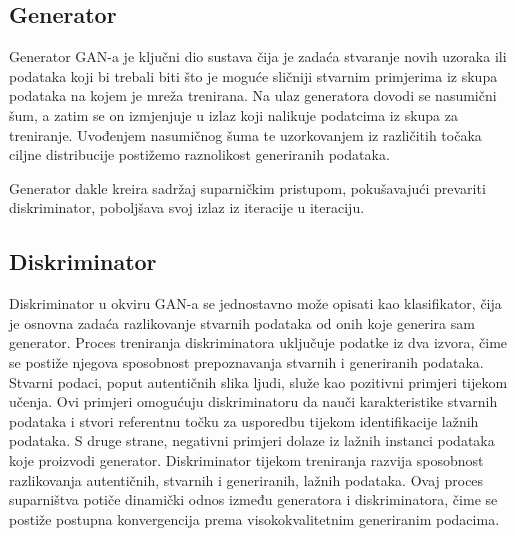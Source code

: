 \documentclass[seminarski, times, utf8]{fer}
\begin{document}
\subsection{Generator}
Generator GAN-a je ključni dio sustava čija je zadaća stvaranje novih uzoraka ili podataka koji bi trebali biti što je moguće sličniji stvarnim primjerima iz skupa podataka na kojem je mreža trenirana. 
Na ulaz generatora dovodi se nasumični šum, a zatim se on izmjenjuje u izlaz koji nalikuje podatcima iz skupa za treniranje. Uvođenjem nasumičnog šuma te uzorkovanjem iz različitih točaka ciljne distribucije postižemo raznolikost generiranih podataka.
\begin{figure}[H]
   \centering
\end{figure}
Generator dakle kreira sadržaj suparničkim pristupom, pokušavajući prevariti diskriminator, poboljšava svoj izlaz iz iteracije u iteraciju.

\subsection{Diskriminator}
Diskriminator u okviru GAN-a se jednostavno može opisati kao klasifikator, čija je osnovna zadaća razlikovanje stvarnih podataka od onih koje generira sam generator. Proces treniranja diskriminatora uključuje podatke iz dva izvora, čime se postiže njegova sposobnost prepoznavanja stvarnih i generiranih podataka. Stvarni podaci, poput autentičnih slika ljudi, služe kao pozitivni primjeri tijekom učenja. Ovi primjeri omogućuju diskriminatoru da nauči karakteristike stvarnih podataka i stvori referentnu točku za usporedbu tijekom identifikacije lažnih podataka. S druge strane, negativni primjeri dolaze iz lažnih instanci podataka koje proizvodi generator. Diskriminator tijekom treniranja razvija sposobnost razlikovanja autentičnih, stvarnih i generiranih, lažnih podataka. Ovaj proces suparništva potiče dinamički odnos između generatora i diskriminatora, čime se postiže postupna konvergencija prema visokokvalitetnim generiranim podacima.
\setcounter{subfigure}{0}
\end{document}

